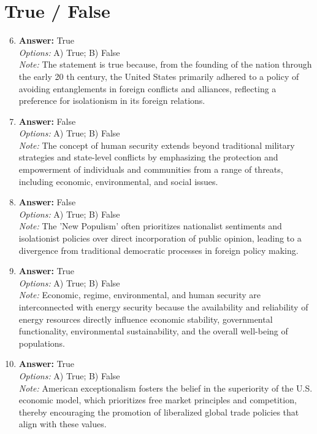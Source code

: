 \documentclass[12pt]{article}
\begin{document}
\section*{True / False}
\begin{enumerate}[label=\arabic*.]
\setcounter{enumi}{5}
\item \textbf{Answer:} True
\\ \textit{Options:} A) True; B) False
\\ \textit{Note:} The statement is true because, from the founding of the nation through the early 20 th century, the United States primarily adhered to a policy of avoiding entanglements in foreign conflicts and alliances, reflecting a preference for isolationism in its foreign relations.
\item \textbf{Answer:} False
\\ \textit{Options:} A) True; B) False
\\ \textit{Note:} The concept of human security extends beyond traditional military strategies and state-level conflicts by emphasizing the protection and empowerment of individuals and communities from a range of threats, including economic, environmental, and social issues.
\item \textbf{Answer:} False
\\ \textit{Options:} A) True; B) False
\\ \textit{Note:} The 'New Populism' often prioritizes nationalist sentiments and isolationist policies over direct incorporation of public opinion, leading to a divergence from traditional democratic processes in foreign policy making.
\item \textbf{Answer:} True
\\ \textit{Options:} A) True; B) False
\\ \textit{Note:} Economic, regime, environmental, and human security are interconnected with energy security because the availability and reliability of energy resources directly influence economic stability, governmental functionality, environmental sustainability, and the overall well-being of populations.
\item \textbf{Answer:} True
\\ \textit{Options:} A) True; B) False
\\ \textit{Note:} American exceptionalism fosters the belief in the superiority of the U.S. economic model, which prioritizes free market principles and competition, thereby encouraging the promotion of liberalized global trade policies that align with these values.
\end{enumerate}
\end{document}
